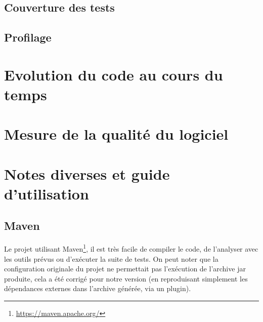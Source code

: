 \documentclass[12pt, openany]{report}
\begin{document}
\subsection{Couverture des tests}
\subsection{Profilage}

\section{Evolution du code au cours du temps}

\section{Mesure de la qualité du logiciel} 

\section{Notes diverses et guide d'utilisation}
\subsection{Maven}
Le projet utilisant Maven\footnote{\url{https://maven.apache.org/}}, il est très facile de compiler le code, de l'analyser avec les outils prévus ou d'exécuter la suite de tests.
On peut noter que la configuration originale du projet ne permettait pas l'exécution de l'archive jar produite, cela a été corrigé pour notre version (en reproduisant simplement les dépendances externes dans l'archive générée, via un plugin).
\end{document}
